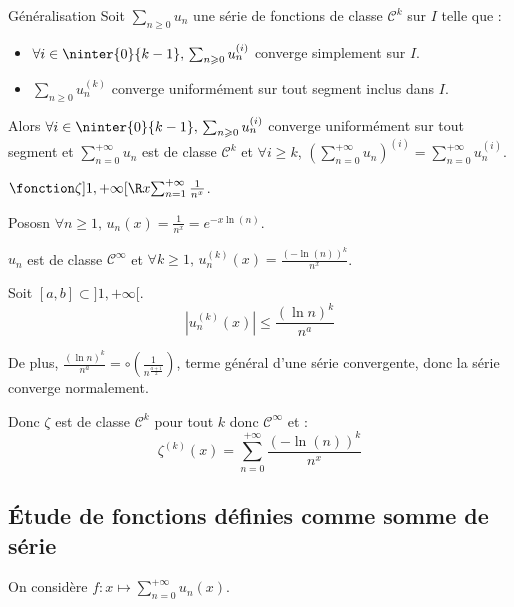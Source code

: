 \begin{theoreme}{Généralisation}{}
    Soit $\sum_{n \geqslant 0} u_n$ une série de fonctions de classe $\mathscr{C}^k$ sur $I$ telle que :
    \begin{itemize}
        \item $\forall i \in \ninter{0}{k - 1}, \, \sum_{n \geqslant 0} u_n^{(i)}$ converge simplement sur $I$.
        \item $\sum_{n \geqslant 0} u_n^{(k)}$ converge uniformément sur tout segment inclus dans $I$.
    \end{itemize}

    Alors $\forall i \in \ninter{0}{k - 1}, \, \sum_{n \geqslant 0} u_n^{(i)}$ converge uniformément sur tout segment
    et $\displaystyle \sum_{n = 0}^{+ \infty} u_n$ est de classe $\mathscr{C}^k$ et 
    $\forall i \geqslant k$, $\displaystyle \left( \sum_{n = 0}^{+ \infty} u_n \right)^{(i)} = \sum_{n = 0}^{+ \infty} u_n^{(i)}$.
\end{theoreme}

\begin{exemple}
    $\fonction \zeta {]1, + \infty[}{\R} x {\sum_{n = 1}^{+ \infty} \frac 1 {n^x}}$.

    Pososn $\forall n \geqslant 1, \, u_n(x) = \frac 1 {n^x} = e^{-x \ln(n)}$.

    $u_n$ est de classe $\mathscr {C}^{\infty}$ et $\forall k \geqslant 1, \, u_n^{(k)}(x) = \frac{(- \ln(n))^k}{n^x}$. 

    Soit $[a, b] \subset ]1, +\infty[$.
    \[\left| u_n^{(k)}(x) \right| \leqslant \frac{(\ln n )^k}{n^a}\]

    De plus, $\displaystyle \frac{(\ln n)^k}{n^a} = \circ \left( \frac 1 {n^{\frac{a + 1}{2}}} \right)$, terme 
    général d'une série convergente, donc la série converge normalement. 

    Donc $\zeta$ est de classe $\mathscr{C}^{k}$ pour tout $k$ donc $\mathscr{C}^{\infty}$ et :
    \[\zeta^{(k)}(x) = \sum_{n = 0}^{+ \infty} \frac{(- \ln(n))^k}{n^x}\]
\end{exemple}

\subsection{Étude de fonctions définies comme somme de série }

On considère $f : \displaystyle x \mapsto \sum_{n = 0}^{+ \infty} u_n(x)$. 

